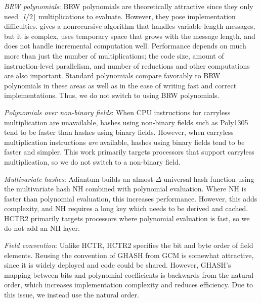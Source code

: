 \documentclass[hctr.tex]{subfiles}
\begin{document}
\emph{BRW polynomials}: BRW polynomials\cite{pema}\cite{heh2} are theoretically
attractive since they only need $\lfloor l/2 \rfloor$ multiplications to
evaluate. However, they pose implementation difficulties. \cite{brweval} gives a
nonrecursive algorithm that handles variable-length messages, but it is complex,
uses temporary space that grows with the message length, and does not handle
incremental computation well. Performance depends on much more than just the
number of multiplications; the code size, amount of instruction-level
parallelism, and number of reductions and other computations are also important.
Standard polynomials compare favorably to BRW polynomials in these areas as well
as in the ease of writing fast and correct implementations. Thus, we do not
switch to using BRW polynomials.

\emph{Polynomials over non-binary fields}: When CPU instructions for carryless
multiplication are unavailable, hashes using non-binary fields such as
Poly1305\cite{poly1305} tend to be faster than hashes using binary fields.
However, when carryless multiplication instructions \emph{are} available, hashes
using binary fields tend to be faster and simpler. This work primarily targets
processors that support carryless multiplication, so we do not switch to a
non-binary field.

\emph{Multivariate hashes}: Adiantum\cite{adiantum} builds an
almost-$\Delta$-universal hash function using the multivariate hash
NH\cite{umac1} combined with polynomial evaluation. Where NH is faster than
polynomial evaluation, this increases performance. However, this adds
complexity, and NH requires a long key which needs to be derived and cached. 
HCTR2 primarily targets processors where polynomial evaluation is fast, so
we do not add an NH layer.

\emph{Field convention}: Unlike HCTR, HCTR2 specifies the bit and byte order of
field elements. Reusing the convention of GHASH from GCM\cite{gcm} is somewhat
attractive, since it is widely deployed and code could be shared. However,
GHASH's mapping between bits and polynomial coefficients is backwards from the
natural order, which increases implementation complexity and reduces efficiency.
Due to this issue, we instead use the natural order.
\end{document}
